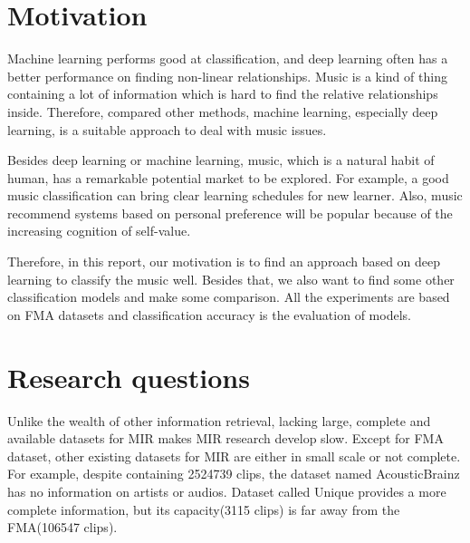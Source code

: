 \documentclass{article}
\begin{document}
\section{Motivation}
Machine learning performs good at classification, and deep learning often has a better performance on finding non-linear relationships. Music is a kind of thing containing a lot of information which is hard to find the relative relationships inside. Therefore, compared other methods, machine learning, especially deep learning, is a suitable approach to deal with music issues. 

Besides deep learning or machine learning, music, which is a natural habit of human, has a remarkable potential market to be explored. For example, a good music classification can bring clear learning schedules for new learner. Also, music recommend systems based on personal preference will be popular because of the increasing cognition of self-value. 

Therefore, in this report, our motivation is to find an approach based on deep learning to classify the music well. Besides that, we also want to find some other classification models and make some comparison. All the experiments are based on FMA datasets and classification accuracy is the evaluation of models.


\section{Research questions} 
Unlike the wealth of other information retrieval, lacking large, complete and available datasets for MIR makes MIR research develop slow. Except for FMA dataset, other existing datasets for MIR are either in small scale or not complete. 
For example, despite containing 2524739 clips, the dataset named AcousticBrainz has no information on artists or audios. Dataset called Unique provides a more complete information, but its capacity(3115 clips) is far away from the FMA(106547 clips). \cite{fma}
\end{document}
